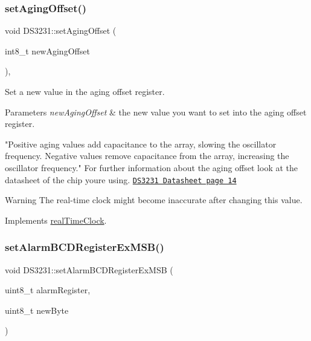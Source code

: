\subsubsection{\texorpdfstring{set\+Aging\+Offset()}{setAgingOffset()}}
{\footnotesize\ttfamily void D\+S3231\+::set\+Aging\+Offset (\begin{DoxyParamCaption}\item[{int8\+\_\+t}]{new\+Aging\+Offset }\end{DoxyParamCaption})\hspace{0.3cm}{\ttfamily [override]}, {\ttfamily [virtual]}}



Set a new value in the aging offset register. 


\begin{DoxyParams}{Parameters}
{\em new\+Aging\+Offset} & the new value you want to set into the aging offset register.\\
\hline
\end{DoxyParams}
"Positive aging values add capacitance to the array, slowing the oscillator frequency. Negative values remove capacitance from the array, increasing the oscillator frequency." For further information about the aging offset look at the datasheet of the chip you\textquotesingle{}re using. \href{https://datasheets.maximintegrated.com/en/ds/DS3231.pdf}{\tt D\+S3231 Datasheet page 14} \begin{DoxyWarning}{Warning}
The real-\/time clock might become inaccurate after changing this value. 
\end{DoxyWarning}


Implements \mbox{\hyperlink{classreal_time_clock_aacf97da86677ee3fb55b5180ba5c0727}{real\+Time\+Clock}}.

\mbox{\label{class_d_s3231_a79280f7161eaa45b50fe649eda9c480a}} 
\subsubsection{\texorpdfstring{set\+Alarm\+B\+C\+D\+Register\+Ex\+M\+S\+B()}{setAlarmBCDRegisterExMSB()}}
{\footnotesize\ttfamily void D\+S3231\+::set\+Alarm\+B\+C\+D\+Register\+Ex\+M\+SB (\begin{DoxyParamCaption}\item[{uint8\+\_\+t}]{alarm\+Register,  }\item[{uint8\+\_\+t}]{new\+Byte }\end{DoxyParamCaption})\hspace{0.3cm}{\ttfamily [private]}}



